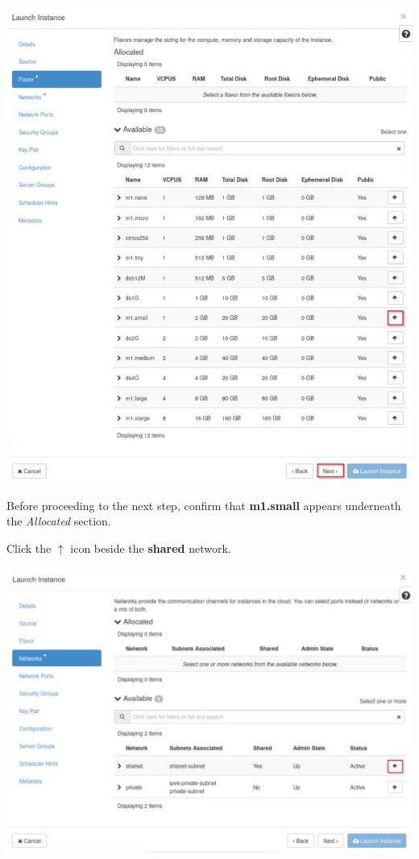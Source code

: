 \documentclass[letterpaper, 12pt]{article}
\begin{document}
\begin{enumerate}
\begin{labstep}
        \begin{center}
            \includegraphics[width=\linewidth]{images/part1/step8.png}
        \end{center}
    \end{labstep}

    \begin{stopbox}
        Before proceeding to the next step, confirm that \textbf{m1.small} appears underneath the \textit{Allocated} section.
    \end{stopbox}

    \begin{labstep}
        Click the $\uparrow$ icon beside the \textbf{shared} network.

        \begin{center}
            \includegraphics[width=\linewidth]{images/part1/step9.png}
        \end{center}
    \end{labstep}


\end{enumerate}
\end{document}
